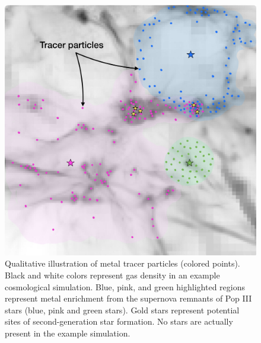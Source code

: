 \documentclass[letterpaper, 12pt]{article}
\begin{document}
\begin{figure}
  \includegraphics[width=\textwidth]{figures/tracer_final}
  \caption{Qualitative illustration of metal tracer particles (colored points). Black and white colors represent gas density in an example cosmological simulation. Blue, pink, and green highlighted regions represent metal enrichment from the supernova remnants of Pop III stars (blue, pink and green stars). Gold stars represent potential sites of second-generation star formation. No stars are actually present in the example simulation.}
  \label{fig:tracer}    
\end{figure}
\end{document}
